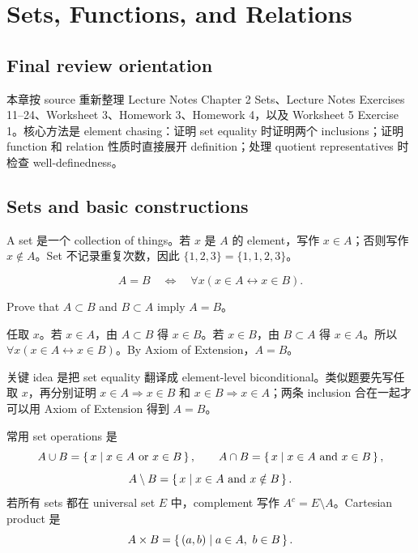\chapter{Sets, Functions, and Relations}
\label{chap:sets-functions-relations}

\section*{Final review orientation}

本章按 source 重新整理 Lecture Notes Chapter 2 Sets、Lecture Notes Exercises 11--24、Worksheet 3、Homework 3、Homework 4，以及 Worksheet 5 Exercise 1。核心方法是 element chasing：证明 set equality 时证明两个 inclusions；证明 function 和 relation 性质时直接展开 definition；处理 quotient representatives 时检查 well-definedness。

\section{Sets and basic constructions}

A set 是一个 collection of things。若 \(x\) 是 \(A\) 的 element，写作 \(x\in A\)；否则写作 \(x\notin A\)。Set 不记录重复次数，因此 \(\{1,2,3\}=\{1,1,2,3\}\)。

\begin{definition}
\[
A=B\quad\Longleftrightarrow\quad \forall x(x\in A\leftrightarrow x\in B).
\]
\end{definition}

\begin{exerciseblock}
Prove that \(A\subset B\) and \(B\subset A\) imply \(A=B\)。
\end{exerciseblock}

\begin{solution}
任取 \(x\)。若 \(x\in A\)，由 \(A\subset B\) 得 \(x\in B\)。若 \(x\in B\)，由 \(B\subset A\) 得 \(x\in A\)。所以 \(\forall x(x\in A\leftrightarrow x\in B)\)。By Axiom of Extension，\(A=B\)。
\end{solution}

\begin{explanation}
关键 idea 是把 set equality 翻译成 element-level biconditional。类似题要先写任取 \(x\)，再分别证明 \(x\in A\Rightarrow x\in B\) 和 \(x\in B\Rightarrow x\in A\)；两条 inclusion 合在一起才可以用 Axiom of Extension 得到 \(A=B\)。
\end{explanation}

常用 set operations 是
\[
A\cup B=\left\{\,x\mid x\in A\text{ or }x\in B\,\right\},\qquad
A\cap B=\left\{\,x\mid x\in A\text{ and }x\in B\,\right\},
\]
\[
A\setminus B=\left\{\,x\mid x\in A\text{ and }x\notin B\,\right\}.
\]
若所有 sets 都在 universal set \(E\) 中，complement 写作 \(A^c=E\setminus A\)。Cartesian product 是
\[
A\times B=\left\{\,(a,b)\mid a\in A,\ b\in B\,\right\}.
\]

